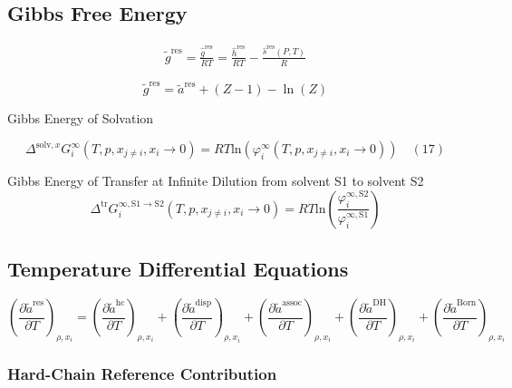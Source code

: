 \documentclass[12pt, letterpaper]{article}
\begin{document}
\subsection{Gibbs Free Energy}

\begin{equation}
\begin{aligned}
\tilde{g}^{\mathrm{res}}=\frac{\hat{g}^{\mathrm{res}}}{RT}=\frac{\hat{h}^{\mathrm{res}}}{RT}-\frac{\hat{s}^{\mathrm{res}}(P,T)}{R}
\end{aligned}
\end{equation}

\begin{equation}
\tilde{g}^{\mathrm{res}}=\tilde{a}^{\mathrm{res}}+(Z-1)-\ln(Z)
\end{equation}

Gibbs Energy of Solvation

\begin{equation}
\Delta^{\mathrm{solv},x}G_{i}^{\infty}(T,p,x_{j\neq i},x_{i}\to0)=RT\mathrm{ln}(\varphi_{i}^{\infty}(T,p,x_{j\neq i},x_{i}\to0))\quad(17)
\end{equation}

Gibbs Energy of Transfer at Infinite Dilution from solvent S1 to solvent S2
\begin{equation}
\Delta^{\mathrm{tr}}G_{i}^{\infty,\mathrm{S}1\to\mathrm{S}2}(T,p,x_{j\neq i},x_{i}\rightarrow0)=RT\mathrm{ln}\left(\frac{\varphi_{i}^{\infty,\mathrm{S}2}}{\varphi_{i}^{\infty,\mathrm{S}1}}\right)
\end{equation}

\subsection{Temperature Differential Equations}

\begin{equation}
\left(\frac{\partial\tilde{a}^\mathrm{res}}{\partial T}\right)_{\rho,x_i} =\left(\frac{\partial\tilde{a}^\mathrm{hc}}{\partial T}\right)_{\rho,x_i} +\left(\frac{\partial\tilde{a}^\mathrm{disp}}{\partial T}\right)_{\rho,x_i}
+\left(\frac{\partial\tilde{a}^\mathrm{assoc}}{\partial T}\right)_{\rho,x_i}
+\left(\frac{\partial\tilde{a}^\mathrm{DH}}{\partial T}\right)_{\rho,x_i}
+\left(\frac{\partial\tilde{a}^\mathrm{Born}}{\partial T}\right)_{\rho,x_i}
\end{equation}

\subsubsection{Hard-Chain Reference Contribution}
\end{document}

